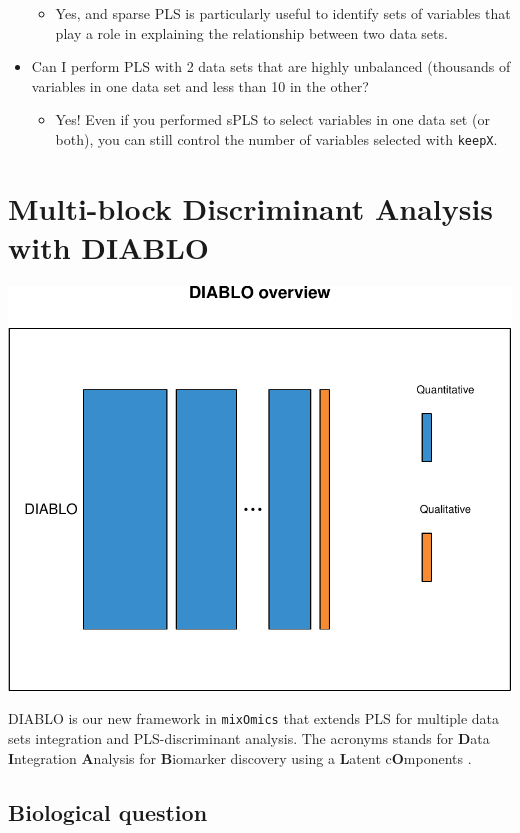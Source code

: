 \documentclass[]{book}
\providecommand{\tightlist}{%
  \setlength{\itemsep}{0pt}\setlength{\parskip}{0pt}}
\begin{document}
\begin{itemize}
  \begin{itemize}
  \tightlist
  \item
    Yes, and sparse PLS is particularly useful to identify sets of variables that play a role in explaining the relationship between two data sets.
  \end{itemize}
\item
  Can I perform PLS with 2 data sets that are highly unbalanced (thousands of variables in one data set and less than 10 in the other?

  \begin{itemize}
  \tightlist
  \item
    Yes! Even if you performed sPLS to select variables in one data set (or both), you can still control the number of variables selected with \texttt{keepX}.
  \end{itemize}
\end{itemize}

\hypertarget{diablo}{%
\chapter{Multi-block Discriminant Analysis with DIABLO}\label{diablo}}

\begin{center}\includegraphics[width=0.5\linewidth,]{Figures/06-overview-DIABLO-1} \end{center}

DIABLO is our new framework in \texttt{mixOmics} that extends PLS for multiple data sets integration and PLS-discriminant analysis. The acronyms stands for \textbf{D}ata \textbf{I}ntegration \textbf{A}nalysis for \textbf{B}iomarker discovery using a \textbf{L}atent c\textbf{O}mponents \citep{Sin16}.

\hypertarget{biological-question-4}{%
\section{Biological question}\label{biological-question-4}}
\end{document}
